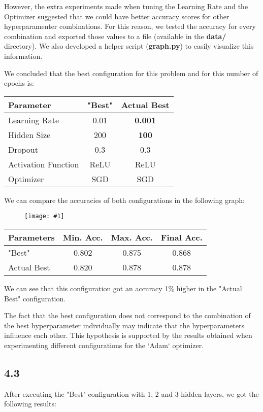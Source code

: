 \documentclass[10pt]{article}
\newcommand{\img}[1]{\begin{figure}[H]\centering\texttt{[image: \#1]}\end{figure}}
\begin{document}
However, the extra experiments made when tuning the Learning Rate and the Optimizer suggested that we could have better accuracy scores for other hyperparamenter combinations.
For this reason, we tested the accuracy for every combination and exported those values to a file (available in the {\bf data/} directory).
We also developed a helper script ({\bf graph.py}) to easily visualize this information.

We concluded that the best configuration for this problem and for this number of epochs is:
\begin{center}
\begin{tabular}{||l|c|c||}
\hline
Parameter           & "Best" & Actual Best \\
\hline\hline
Learning Rate       & 0.01   & {\bf 0.001}  \\
\hline
Hidden Size         & 200    & {\bf 100}    \\
\hline
Dropout             & 0.3    & 0.3         \\
\hline
Activation Function & ReLU   & ReLU        \\
\hline
Optimizer           & SGD    & SGD         \\
\hline
\end{tabular}
\end{center}
We can compare the accuracies of both configurations in the following graph:

\img{tuning/best_vs_actual_best.png}
\begin{center}
\begin{tabular}{||l|c|c|c||}
\hline
Parameters  & Min. Acc. & Max. Acc. & Final Acc. \\
\hline\hline
"Best"      & 0.802     & 0.875     & 0.868      \\
\hline
Actual Best & 0.820     & 0.878     & 0.878      \\
\hline
\end{tabular}
\end{center}
We can see that this configuration got an accuracy 1\% higher in the "Actual Best" configuration.


The fact that the best configuration does not correspond to the combination of the best hyperparameter individually may indicate that the hyperparameters influence each other.
This hypothesis is supported by the results obtained when experimenting different configurations for the `Adam` optimizer.

\subsection{4.3}
After executing the "Best" configuration with 1, 2 and 3 hidden layers, we got the following results:
\end{document}
